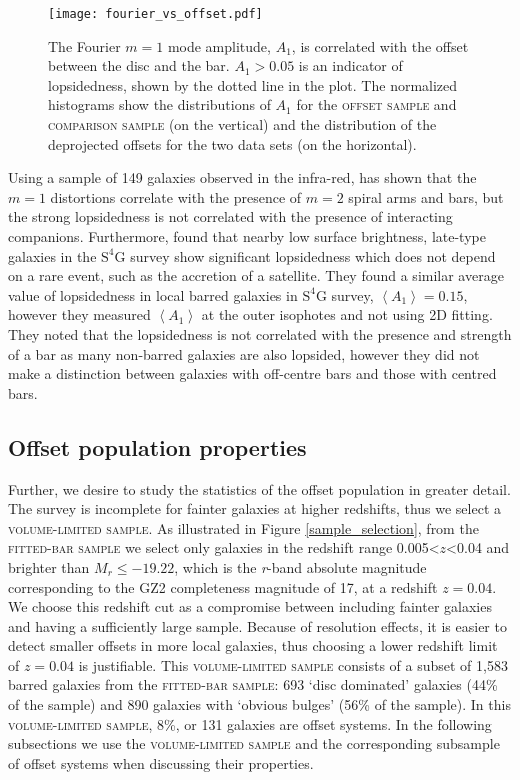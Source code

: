 \documentclass[a4paper,fleqn,usenatbib,useAMS]{mnras}
\begin{document}
\begin{figure}
 \texttt{[image: fourier\_vs\_offset.pdf]}
 \caption{The Fourier $\textit{m}=1$ mode amplitude, $A_{1}$, is correlated with the offset between the disc and the bar. $A_{1}>0.05$ is an indicator of lopsidedness, shown by the dotted line in the plot. The normalized histograms show the distributions of $A_{1}$ for the \textsc{offset sample} and \textsc{comparison sample} (on the vertical) and the distribution of the deprojected offsets for the two data sets (on the horizontal).}
 \label{fourier}
\end{figure}

Using a sample of 149 galaxies observed in the infra-red, \citet{Bournaud2005} has shown that the $m=1$ distortions correlate with the presence of $m=2$ spiral arms and bars, but the strong lopsidedness is not correlated with the presence of interacting companions. Furthermore, \citet{Zaritsky2013} found that nearby low surface brightness, late-type galaxies in the $\mathrm{S^{4}G}$ survey show significant lopsidedness which does not depend on a rare event, such as the accretion of a satellite. They found a similar average value of lopsidedness in local barred galaxies in $\mathrm{S^{4}G}$ survey, $\left<A_{1}\right>=0.15$, however they measured $\left<A_{1}\right>$ at the outer isophotes and not using 2D fitting. They noted that the lopsidedness is not correlated with the presence and strength of a bar as many non-barred galaxies are also lopsided, however they did not make a distinction between galaxies with off-centre bars and those with centred bars. 


\subsection{Offset population properties}

Further, we desire to study the statistics of the offset population in greater detail. The survey is incomplete for fainter galaxies at higher redshifts, thus we select a \textsc{volume-limited sample}. As illustrated in Figure \ref{sample_selection}, from the \textsc{fitted-bar sample} we select only galaxies in the redshift range 0.005<$z$<0.04 and brighter than $M_{r}\le-19.22$, which is the \textit{r}-band absolute magnitude corresponding to the GZ2 completeness magnitude of 17, at a redshift $z=0.04$. We choose this redshift cut as a compromise between including fainter galaxies and having a sufficiently large sample. Because of resolution effects, it is easier to detect smaller offsets in more local galaxies, thus choosing a lower redshift limit of $z=0.04$ is justifiable. This \textsc{volume-limited sample} consists of a subset of 1,583 barred galaxies from the \textsc{fitted-bar sample}: 693 `disc dominated' galaxies (44\% of the sample) and 890 galaxies with `obvious bulges' (56\% of the sample). In this \textsc{volume-limited sample}, 8\%, or 131 galaxies are offset systems. In the following subsections we use the \textsc{volume-limited sample} and the corresponding subsample of offset systems when discussing their properties.
\end{document}
